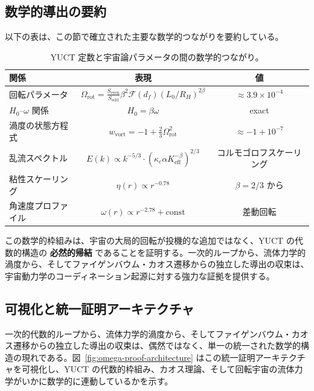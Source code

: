 \documentclass[11pt,a4paper]{article}
\begin{document}
	\subsection{数学的導出の要約}
	
	以下の表は、この節で確立された主要な数学的つながりを要約している。
	
	\begin{table}[htbp]
		\centering
		\caption{YUCT 定数と宇宙論パラメータの間の数学的つながり。}
		\label{tab:math-connections}
		\begin{tabular}{l c c}
			\toprule
			\textbf{関係} & \textbf{表現} & \textbf{値} \\
			\midrule
			回転パラメータ & \(\Omega_{\mathrm{rot}} = \frac{S_{\mathrm{even}}}{S_{\mathrm{odd}}} \beta^2 \mathcal{F}(d_f) (L_0/R_H)^{2\beta}\) & \(\approx 3.9 \times 10^{-4}\) \\
			\(H_0\)–\(\omega\) 関係 & \(H_0 = \beta \omega\) & exact \\
			渦度の状態方程式 & \(w_{\mathrm{vort}} = -1 + \frac{2}{3}\Omega_{\mathrm{rot}}^2\) & \(\approx -1 + 10^{-7}\) \\
			乱流スペクトル & \(E(k) \propto k^{-5/3} \cdot (\kappa_c \alpha K_{\mathrm{eff}}^{-\beta})^{2/3}\) & コルモゴロフスケーリング \\
			粘性スケーリング & \(\eta(r) \propto r^{-0.78}\) & \(\beta = 2/3\) から \\
			角速度プロファイル & \(\omega(r) \propto r^{-2.78} + \text{const}\) & 差動回転 \\
			\bottomrule
		\end{tabular}
	\end{table}
	
	この数学的枠組みは、宇宙の大局的回転が投機的な追加ではなく、YUCT の代数的構造の \textbf{必然的帰結} であることを証明する。一次的ループから、流体力学的渦度から、そしてファイゲンバウム・カオス遷移からの独立した導出の収束は、宇宙動力学のコーディネーション起源に対する強力な証拠を提供する。
	
	\subsection{可視化と統一証明アーキテクチャ}
	\label{subsec:visualization}
	
	一次的代数的ループから、流体力学的渦度から、そしてファイゲンバウム・カオス遷移からの独立した導出の収束は、偶然ではなく、単一の統一された数学的構造の現れである。図~\ref{fig:omega-proof-architecture} はこの統一証明アーキテクチャを可視化し、YUCT の代数的枠組み、カオス理論、そして回転宇宙の流体力学がいかに数学的に連動しているかを示す。
	
\end{document}
